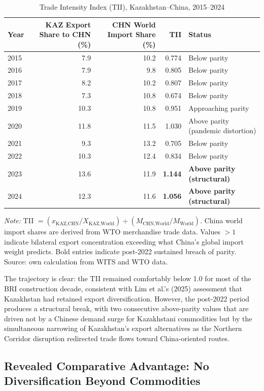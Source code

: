 \documentclass[12pt]{article}
\begin{document}
\begin{table}[H]
\centering
\small
\caption{Trade Intensity Index (TII), Kazakhstan--China, 2015--2024}
\label{tab:tii_annual}
\begin{tabular}{lrrrl}
\toprule
Year & KAZ Export Share to CHN (\%) & CHN World Import Share (\%) & TII & Status \\
\midrule
2015 & 7.9 & 10.2 & 0.774 & Below parity \\
2016 & 7.9 & 9.8  & 0.805 & Below parity \\
2017 & 8.2 & 10.2 & 0.807 & Below parity \\
2018 & 7.3 & 10.8 & 0.674 & Below parity \\
2019 & 10.3 & 10.8 & 0.951 & Approaching parity \\
2020 & 11.8 & 11.5 & 1.030 & Above parity (pandemic distortion) \\
2021 & 9.3  & 13.2 & 0.705 & Below parity \\
2022 & 10.3 & 12.4 & 0.834 & Below parity \\
2023 & 13.6 & 11.9 & \textbf{1.144} & \textbf{Above parity (structural)} \\
2024 & 12.3 & 11.6 & \textbf{1.056} & \textbf{Above parity (structural)} \\
\bottomrule
\end{tabular}
\footnotesize

\emph{Note:} TII $= (x_{\text{KAZ,CHN}} / X_{\text{KAZ,World}}) \div (M_{\text{CHN,World}} / M_{\text{World}})$. China world import shares are derived from WTO merchandise trade data. Values $> 1$ indicate bilateral export concentration exceeding what China's global import weight predicts. Bold entries indicate post-2022 sustained breach of parity. Source: own calculation from WITS and WTO data.
\end{table}

The trajectory is clear: the TII remained comfortably below 1.0 for most of the BRI construction decade, consistent with Lim et al.'s (2025) assessment that Kazakhstan had retained export diversification. However, the post-2022 period produces a structural break, with two consecutive above-parity values that are driven not by a Chinese demand surge for Kazakhstani commodities but by the simultaneous narrowing of Kazakhstan's export alternatives as the Northern Corridor disruption redirected trade flows toward China-oriented routes.

\subsection{Revealed Comparative Advantage: No Diversification Beyond Commodities}
\end{document}
